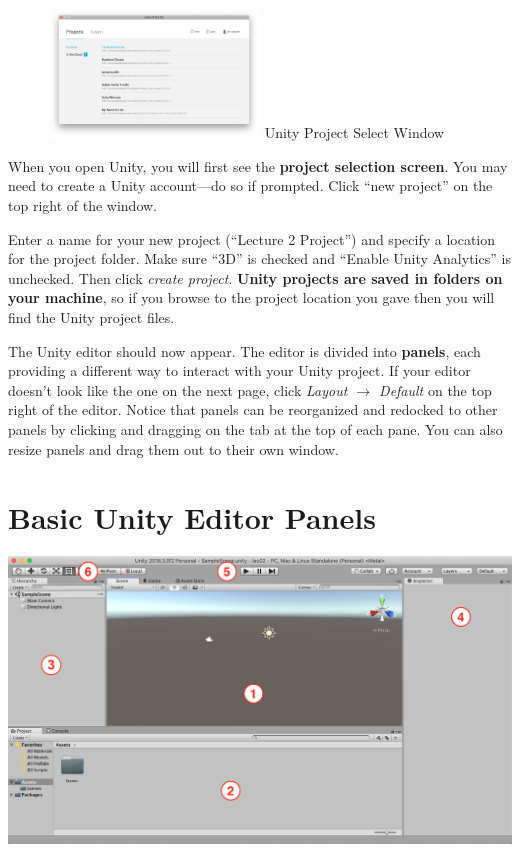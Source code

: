 \documentclass[11pt]{article}
\begin{document}
\begin{figure}
    \centering
    \includegraphics[width=0.5\textwidth]{proj-select}
    Unity Project Select Window
\end{figure}


When you open Unity, you will first see the {\bf project selection screen}.  You may need to create a Unity account—do so if prompted.  Click ``new project'' on the top right of the window.

Enter a name for your new project (``Lecture 2 Project'') and specify a location for the project folder.  Make sure ``3D'' is checked and ``Enable Unity Analytics'' is unchecked.  Then click {\it create project}.  \textbf{Unity projects are saved in folders on your machine}, so if you browse to the project location you gave then you will find the Unity project files.

The Unity editor should now appear.  The editor is divided into \textbf{panels}, each providing a different way to interact with your Unity project.  If your editor doesn’t look like the one on the next page, click \textit{Layout $\rightarrow$ Default} on the top right of the editor.  Notice that panels can be reorganized and redocked to other panels by clicking and dragging on the tab at the top of each pane.  You can also resize panels and drag them out to their own window.

\pagebreak
\section{Basic Unity Editor Panels}

{
\centering \noindent
\includegraphics[width=1.0\textwidth]{basic-editor-panes}
}
\end{document}
